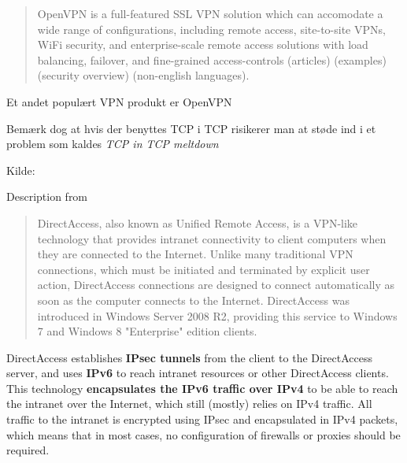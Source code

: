 \documentclass[Screen16to9,17pt]{foils}
\begin{document}

\begin{quote}
OpenVPN is a full-featured SSL VPN solution which can accomodate a
wide range of configurations, including remote access, site-to-site
VPNs, WiFi security, and enterprise-scale remote access solutions with
load balancing, failover, and fine-grained access-controls (articles)
(examples) (security overview) (non-english languages).
\end{quote}

\begin{list1}
\item Et andet populært VPN produkt er OpenVPN
\item Bemærk dog at hvis der benyttes TCP i TCP risikerer man at støde ind i
et problem som kaldes \emph{TCP in TCP meltdown}
\item Kilde: 
\end{list1}





Description from 
\begin{quote}\small
DirectAccess, also known as Unified Remote Access, is a VPN-like technology that provides intranet connectivity to client computers when they are connected to the Internet. Unlike many traditional VPN connections, which must be initiated and terminated by explicit user action, DirectAccess connections are designed to connect automatically as soon as the computer connects to the Internet. DirectAccess was introduced in Windows Server 2008 R2, providing this service to Windows 7 and Windows 8 "Enterprise" edition clients.
\end{quote}

\begin{list2}
\item DirectAccess establishes {\bf IPsec tunnels} from the client to the DirectAccess server, and uses {\bf IPv6} to reach intranet resources or other DirectAccess clients. This technology {\bf encapsulates the IPv6 traffic over IPv4} to be able to reach the intranet over the Internet, which still (mostly) relies on IPv4 traffic. All traffic to the intranet is encrypted using IPsec and encapsulated in IPv4 packets, which means that in most cases, no configuration of firewalls or proxies should be required.
\end{list2}


\slidenext
\end{document}
